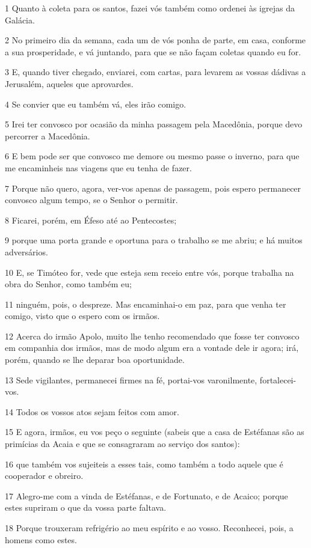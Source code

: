 \par 1 Quanto à coleta para os santos, fazei vós também como ordenei às igrejas da Galácia.
\par 2 No primeiro dia da semana, cada um de vós ponha de parte, em casa, conforme a sua prosperidade, e vá juntando, para que se não façam coletas quando eu for.
\par 3 E, quando tiver chegado, enviarei, com cartas, para levarem as vossas dádivas a Jerusalém, aqueles que aprovardes.
\par 4 Se convier que eu também vá, eles irão comigo.
\par 5 Irei ter convosco por ocasião da minha passagem pela Macedônia, porque devo percorrer a Macedônia.
\par 6 E bem pode ser que convosco me demore ou mesmo passe o inverno, para que me encaminheis nas viagens que eu tenha de fazer.
\par 7 Porque não quero, agora, ver-vos apenas de passagem, pois espero permanecer convosco algum tempo, se o Senhor o permitir.
\par 8 Ficarei, porém, em Éfeso até ao Pentecostes;
\par 9 porque uma porta grande e oportuna para o trabalho se me abriu; e há muitos adversários.
\par 10 E, se Timóteo for, vede que esteja sem receio entre vós, porque trabalha na obra do Senhor, como também eu;
\par 11 ninguém, pois, o despreze. Mas encaminhai-o em paz, para que venha ter comigo, visto que o espero com os irmãos.
\par 12 Acerca do irmão Apolo, muito lhe tenho recomendado que fosse ter convosco em companhia dos irmãos, mas de modo algum era a vontade dele ir agora; irá, porém, quando se lhe deparar boa oportunidade.
\par 13 Sede vigilantes, permanecei firmes na fé, portai-vos varonilmente, fortalecei-vos.
\par 14 Todos os vossos atos sejam feitos com amor.
\par 15 E agora, irmãos, eu vos peço o seguinte (sabeis que a casa de Estéfanas são as primícias da Acaia e que se consagraram ao serviço dos santos):
\par 16 que também vos sujeiteis a esses tais, como também a todo aquele que é cooperador e obreiro.
\par 17 Alegro-me com a vinda de Estéfanas, e de Fortunato, e de Acaico; porque estes supriram o que da vossa parte faltava.
\par 18 Porque trouxeram refrigério ao meu espírito e ao vosso. Reconhecei, pois, a homens como estes.
